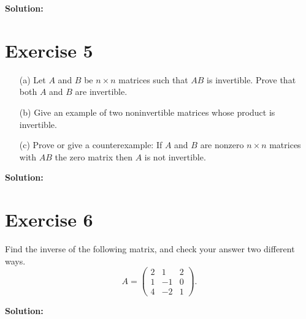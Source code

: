 \documentclass{article}
\begin{document}
\textbf{Solution: } \\



\newpage

\section*{Exercise 5}
\begin{enumerate}
\item[(a)] Let $A$ and $B$ be $n \times n$ matrices such that $AB$ is invertible. Prove that both $A$ and $B$ are invertible.
\item[(b)] Give an example of two noninvertible matrices whose product is invertible.
\item[(c)] Prove or give a counterexample: If $A$ and $B$ are nonzero $n \times n$ matrices with $AB$ the zero matrix then $A$ is not invertible.
\end{enumerate}

\textbf{Solution: } \\



\newpage

\section*{Exercise 6}
Find the inverse of the following matrix, and check your answer two different ways.
$$A = \begin{pmatrix} 2 & 1 & 2 \\ 1 & -1 & 0 \\ 4 & -2 & 1 \end{pmatrix}.$$

\textbf{Solution: } \\
\end{document}
